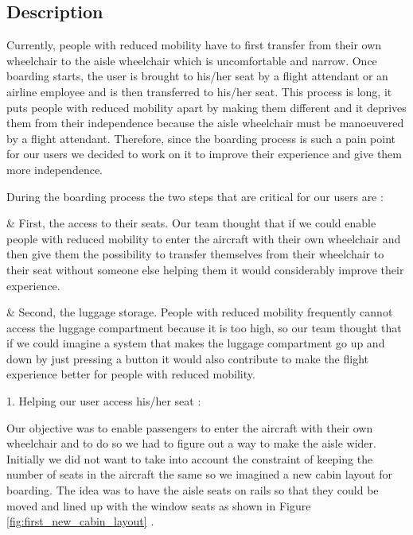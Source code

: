 \subsection{Description}
Currently, people with reduced mobility have to first transfer from their own wheelchair to the aisle wheelchair which is uncomfortable and narrow. Once boarding starts, the user is brought to his/her seat by a flight attendant or an airline employee and is then transferred to his/her seat. This process is long, it puts people with reduced mobility apart by making them different and it deprives them from their independence because the aisle wheelchair must be manoeuvered by a flight attendant. Therefore, since the boarding process is such a pain point for our users we decided to work on it to improve their experience and give them more independence.

During the boarding process the two steps that are critical for our users are :

 \begin{easylist}[itemize]

& First, the access to their seats. Our team thought that if we could enable people with reduced mobility to enter the aircraft with their own wheelchair and then give them the possibility to transfer themselves from their wheelchair to their seat without someone else helping them it would considerably improve their experience.

& Second, the luggage storage. People with reduced mobility frequently cannot access the luggage compartment because it is too high, so our team thought that if we could imagine a system that makes the luggage compartment go up and down by just pressing a button it would also contribute to make the flight experience better for people with reduced mobility.

\end{easylist}

1. Helping our user access his/her seat :

Our objective was to enable passengers to enter the aircraft with their own wheelchair and to do so we had to figure out a way to make the aisle wider. Initially we did not want to take into account the constraint of keeping the number of seats in the aircraft the same so we imagined a new cabin layout for boarding. The idea was to have the aisle seats on rails so that they could be moved and lined up with the window seats as shown in Figure \ref{fig:first_new_cabin_layout} . 


